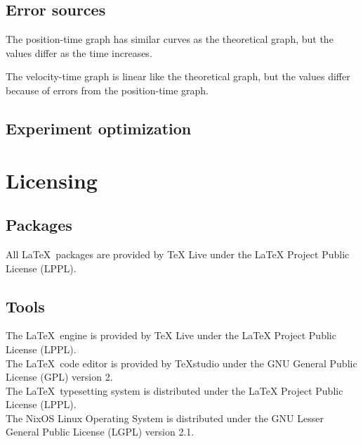 \documentclass[a4paper,12pt]{article}
\begin{document}
	\subsection{Error sources}
	The position-time graph has similar curves as the theoretical graph, but the values differ as the time increases.
	
	The velocity-time graph is linear like the theoretical graph, but the values differ because of errors from the position-time graph. 
	
	\subsection{Experiment optimization}
	
	\newpage
	\section{Licensing}
	\subsection{Packages}
	All \LaTeX\, packages are provided by TeX Live under the LaTeX Project Public License (LPPL).\\
	
	\subsection{Tools}
	The \LaTeX\, engine is provided by TeX Live under the LaTeX Project Public License (LPPL).\\
	
	The \LaTeX\, code editor is provided by TeXstudio under the GNU General Public License (GPL) version 2.\\
	
	The \LaTeX\, typesetting system is distributed under the LaTeX Project Public License (LPPL).\\
	
	The NixOS Linux Operating System is distributed under the GNU Lesser General Public License (LGPL) version 2.1.\\
	
	
\end{document}
